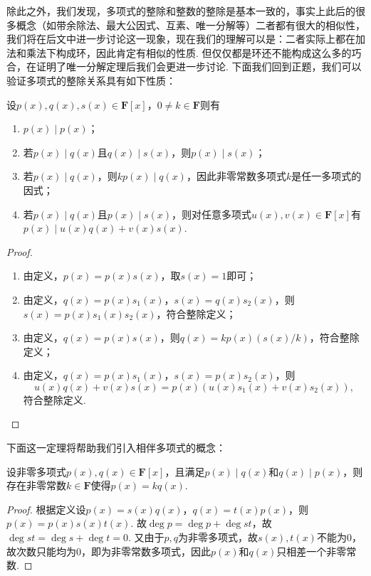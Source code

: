除此之外，我们发现，多项式的整除和整数的整除是基本一致的，事实上此后的很多概念（如带余除法、最大公因式、互素、唯一分解等）二者都有很大的相似性，我们将在后文中进一步讨论这一现象，现在我们的理解可以是：二者实际上都在加法和乘法下构成环，因此肯定有相似的性质. 但仅仅都是环还不能构成这么多的巧合，在证明了唯一分解定理后我们会更进一步讨论. 下面我们回到正题，我们可以验证多项式的整除关系具有如下性质：
\begin{theorem}{}{}
    设$p(x),q(x),s(x)\in\mathbf{F}[x]$，$0\neq k\in\mathbf{F}$则有
    \begin{enumerate}
        \item $p(x)\mid p(x)$；
        \item 若$p(x)\mid q(x)$且$q(x)\mid s(x)$，则$p(x)\mid s(x)$；
        \item 若$p(x)\mid q(x)$，则$kp(x)\mid q(x)$，因此非零常数多项式$k$是任一多项式的因式；
        \item 若$p(x)\mid q(x)$且$p(x)\mid s(x)$，则对任意多项式$u(x),v(x)\in\mathbf{F}[x]$有$p(x)\mid u(x)q(x)+v(x)s(x)$.
    \end{enumerate}
\end{theorem}
\begin{proof}
    \begin{enumerate}
        \item 由定义，$p(x)=p(x)s(x)$，取$s(x)=1$即可；
        \item 由定义，$q(x)=p(x)s_1(x)$，$s(x)=q(x)s_2(x)$，则$s(x)=p(x)s_1(x)s_2(x)$，符合整除定义；
        \item 由定义，$q(x)=p(x)s(x)$，则$q(x)=kp(x)(s(x)/k)$，符合整除定义；
        \item 由定义，$q(x)=p(x)s_1(x)$，$s(x)=p(x)s_2(x)$，则
              \[u(x)q(x)+v(x)s(x)=p(x)(u(x)s_1(x)+v(x)s_2(x)),\]
              符合整除定义.
    \end{enumerate}
\end{proof}

下面这一定理将帮助我们引入相伴多项式的概念：
\begin{theorem}{}{}
    设非零多项式$p(x),q(x)\in\mathbf{F}[x]$，且满足$p(x)\mid q(x)$和$q(x)\mid p(x)$，则存在非零常数$k\in\mathbf{F}$使得$p(x)=kq(x)$.
\end{theorem}
\begin{proof}
    根据定义设$p(x)=s(x)q(x)$，$q(x)=t(x)p(x)$，则$p(x)=p(x)s(x)t(x)$. 故$\deg p=\deg p+\deg st$，故$\deg st=\deg s+\deg t=0$. 又由于$p,q$为非零多项式，故$s(x),t(x)$不能为$0$，故次数只能均为$0$，即为非零常数多项式，因此$p(x)$和$q(x)$只相差一个非零常数.
\end{proof}

